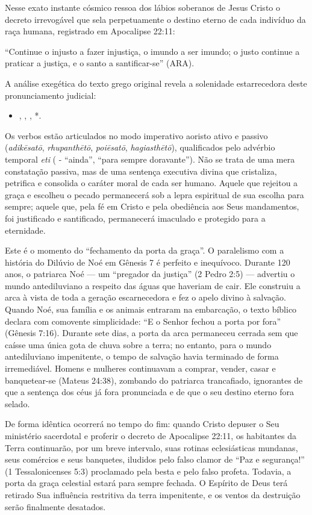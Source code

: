 Nesse exato instante cósmico ressoa dos lábios soberanos de Jesus Cristo o decreto irrevogável que sela perpetuamente o destino eterno de cada indivíduo da raça humana, registrado em Apocalipse 22:11:

``Continue o injusto a fazer injustiça, o imundo a ser imundo; o justo continue a praticar a justiça, e o santo a santificar-se'' (ARA).

A análise exegética do texto grego original revela a solenidade estarrecedora deste pronunciamento judicial:
\begin{itemize}
  \item , , , *.
\end{itemize}


Os verbos estão articulados no modo imperativo aoristo ativo e passivo (\textit{adikēsatō}, \textit{rhupanthētō}, \textit{poiēsatō}, \textit{hagiasthētō}), qualificados pelo advérbio temporal \textit{eti} ( - ``ainda'', ``para sempre doravante''). Não se trata de uma mera constatação passiva, mas de uma sentença executiva divina que cristaliza, petrifica e consolida o caráter moral de cada ser humano. Aquele que rejeitou a graça e escolheu o pecado permanecerá sob a lepra espiritual de sua escolha para sempre; aquele que, pela fé em Cristo e pela obediência aos Seus mandamentos, foi justificado e santificado, permanecerá imaculado e protegido para a eternidade.

Este é o momento do ``fechamento da porta da graça''. O paralelismo com a história do Dilúvio de Noé em Gênesis 7 é perfeito e inequívoco. Durante 120 anos, o patriarca Noé — um ``pregador da justiça'' (2 Pedro 2:5) — advertiu o mundo antediluviano a respeito das águas que haveriam de cair. Ele construiu a arca à vista de toda a geração escarnecedora e fez o apelo divino à salvação. Quando Noé, sua família e os animais entraram na embarcação, o texto bíblico declara com comovente simplicidade: ``E o Senhor fechou a porta por fora'' (Gênesis 7:16). Durante sete dias, a porta da arca permaneceu cerrada sem que caísse uma única gota de chuva sobre a terra; no entanto, para o mundo antediluviano impenitente, o tempo de salvação havia terminado de forma irremediável. Homens e mulheres continuavam a comprar, vender, casar e banquetear-se (Mateus 24:38), zombando do patriarca trancafiado, ignorantes de que a sentença dos céus já fora pronunciada e de que o seu destino eterno fora selado.

De forma idêntica ocorrerá no tempo do fim: quando Cristo depuser o Seu ministério sacerdotal e proferir o decreto de Apocalipse 22:11, os habitantes da Terra continuarão, por um breve intervalo, suas rotinas eclesiásticas mundanas, seus comércios e seus banquetes, iludidos pelo falso clamor de ``Paz e segurança!'' (1 Tessalonicenses 5:3) proclamado pela besta e pelo falso profeta. Todavia, a porta da graça celestial estará para sempre fechada. O Espírito de Deus terá retirado Sua influência restritiva da terra impenitente, e os ventos da destruição serão finalmente desatados.



